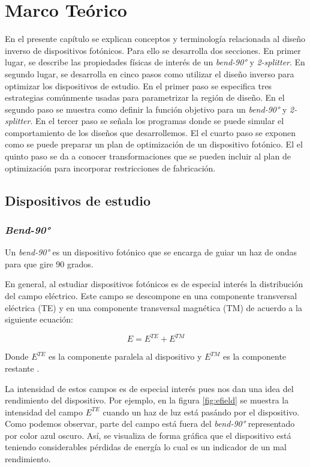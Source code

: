 \chapter{Marco  Teórico}

En el presente capítulo se explican conceptos y terminología relacionada al diseño inverso de dispositivos fotónicos.
Para ello se desarrolla dos secciones. 
En primer lugar, se describe las propiedades físicas de interés de un \emph{bend-90°} y \emph{2-splitter}.
En segundo lugar, se desarrolla en cinco pasos como utilizar el diseño inverso para optimizar los dispositivos de estudio.
En el primer paso se especifica tres estrategias comúnmente usadas para parametrizar la región de diseño.
En el segundo paso se muestra como definir la función objetivo para un \emph{bend-90°} y \emph{2-splitter}.
En el tercer paso se señala los programas donde se puede simular el comportamiento de los diseños que desarrollemos.
El el cuarto paso se exponen como se puede preparar un plan de optimización de un dispositivo fotónico.
El el quinto paso se da a conocer transformaciones que se pueden incluir al plan de optimización para incorporar restricciones de fabricación.


\section{Dispositivos de estudio}

\subsection{\emph{Bend-90°}}

Un \emph{bend-90°} es un dispositivo fotónico que se encarga de guiar un haz de ondas para que gire 90 grados.

En general, al estudiar dispositivos fotónicos es de especial interés la distribución del campo eléctrico. 
Este campo se descompone en una componente transversal eléctrica (TE) y en una componente transversal magnética (TM) de acuerdo a la siguiente ecuación:

\begin{equation}
  E = E^{TE} + E^{TM}
\label{eq:field}
\end{equation}

Donde $E^{TE}$ es la componente paralela al dispositivo y $E^{TM}$ es la componente restante \citep{Hohenester2020}. 

La intensidad de estos campos es de especial interés pues nos dan una idea del rendimiento del dispositivo. 
Por ejemplo, en la figura \ref{fig:efield} se muestra la intensidad del campo $E^{TE}$ cuando un haz de luz está pasándo por el dispositivo. 
Como podemos observar, parte del campo está fuera del \emph{bend-90°} representado por color azul oscuro.
Así, se visualiza de forma gráfica que el dispositivo está teniendo considerables pérdidas de energía lo cual es un indicador de un mal rendimiento.


